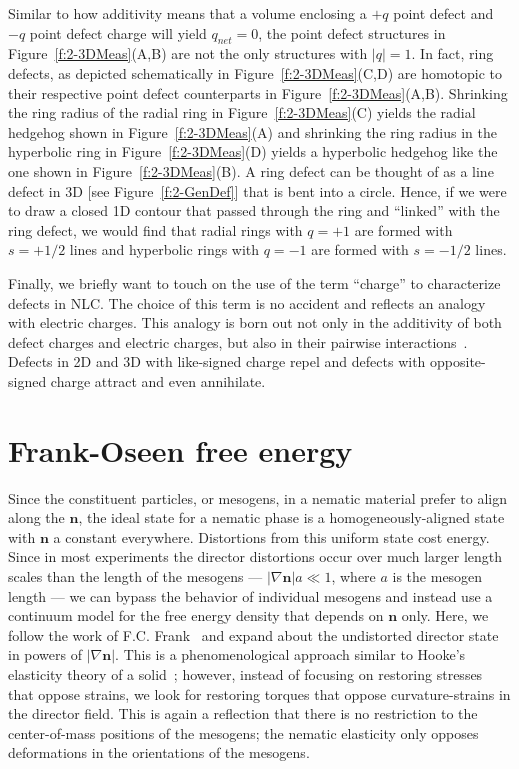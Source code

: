 Similar to how additivity means that a volume enclosing a $+q$ point defect and $-q$ point defect charge will yield $q_{net} = 0$, the point defect structures in Figure~\ref{f:2-3DMeas}(A,B) are not the only structures with $|q| = 1$.
In fact, ring defects, as depicted schematically in Figure~\ref{f:2-3DMeas}(C,D) are homotopic to their respective point defect counterparts in Figure~\ref{f:2-3DMeas}(A,B).
Shrinking the ring radius of the radial ring in Figure~\ref{f:2-3DMeas}(C) yields the radial hedgehog shown in Figure~\ref{f:2-3DMeas}(A) and shrinking the ring radius in the hyperbolic ring in Figure~\ref{f:2-3DMeas}(D) yields a hyperbolic hedgehog like the one shown in Figure~\ref{f:2-3DMeas}(B).
A ring defect can be thought of as a line defect in 3D [see Figure~\ref{f:2-GenDef}] that is bent into a circle.
Hence, if we were to draw a closed 1D contour that passed through the ring and ``linked'' with the ring defect, we would find that radial rings with $q = +1$ are formed with $s = +1/2$ lines and hyperbolic rings with $q = -1$ are formed with $s = -1/2$ lines.

Finally, we briefly want to touch on the use of the term ``charge'' to characterize defects in NLC.\@
The choice of this term is no accident and reflects an analogy with electric charges.
This analogy is born out not only in the additivity of both defect charges and electric charges, but also in their pairwise interactions~\cite{RN33,RN175,RN207}.
Defects in 2D and 3D with like-signed charge repel and defects with opposite-signed charge attract and even annihilate.




\section{Frank-Oseen free energy}
Since the constituent particles, or mesogens, in a nematic material prefer to align along the $\mathbf{n}$, the ideal state for a nematic phase is a homogeneously-aligned state with $\mathbf{n}$ a constant everywhere.
Distortions from this uniform state cost energy.
Since in most experiments the director distortions occur over much larger length scales than the length of the mesogens --- $|\nabla \mathbf{n}| a \ll 1$, where $a$ is the mesogen length --- we can bypass the behavior of individual mesogens and instead use a continuum model for the free energy density that depends on $\mathbf{n}$ only.
Here, we follow the work of F.C. Frank~\cite{RN61} and expand about the undistorted director state in powers of $|\nabla \mathbf{n}|$.
This is a phenomenological approach similar to Hooke's elasticity theory of a solid~\cite{RN175,RN178}; however, instead of focusing on restoring stresses that oppose strains, we look for restoring torques that oppose curvature-strains in the director field.
This is again a reflection that there is no restriction to the center-of-mass positions of the mesogens; the nematic elasticity only opposes deformations in the orientations of the mesogens.

